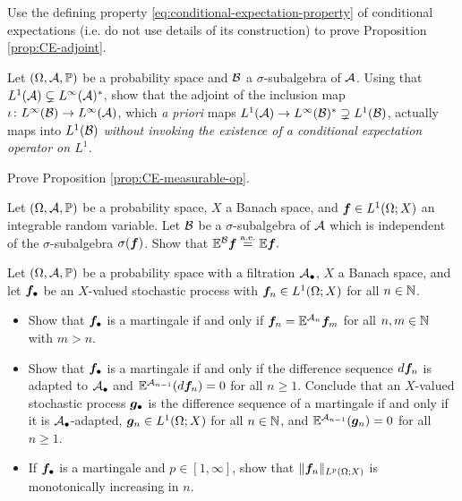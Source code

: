 \begin{exercise}\label{ex:CE-adjoint}
  Use the defining property \eqref{eq:conditional-expectation-property} of conditional expectations (i.e. do not use details of its construction) to prove Proposition \ref{prop:CE-adjoint}.
\end{exercise}

\begin{exercise}\label{ex:conditional-expectation-as-adjoint}
  Let $(\Omega,\mathcal{A},\mathbb{P})$ be a probability space and $\mathcal{B}$ a $\sigma$-subalgebra of $\mathcal{A}$.
  Using that $L^1(\mathcal{A}) \subsetneq L^\infty(\mathcal{A})^*$, show that the adjoint of the inclusion map $\iota \colon L^\infty(\mathcal{B}) \rightarrow L^\infty(\mathcal{A})$, which \emph{a priori} maps $L^1(\mathcal{A}) \to L^\infty(\mathcal{B})^* \supsetneq L^1(\mathcal{B})$, actually maps into $L^1(\mathcal{B})$ \emph{without invoking the existence of a conditional expectation operator on $L^1$.}
\end{exercise}

\begin{exercise}\label{ex:CE-measurable-op}
  Prove Proposition \ref{prop:CE-measurable-op}.
\end{exercise}

\begin{exercise}\label{ex:ce-ind}
  Let $(\Omega,\mathcal{A},\mathbb{P})$ be a probability space, $X$ a Banach space, and $\bm{f} \in L^1(\Omega;X)$ an integrable random variable.
  Let $\mathcal{B}$ be a $\sigma$-subalgebra of $\mathcal{A}$ which is independent of the $\sigma$-subalgebra $\sigma(\bm{f})$.
  Show that $\mathbb{E}^{\mathcal{B}} \bm{f} \stackrel{\mathrm{a.e.}}{=} \mathbb{E} \bm{f}.$
\end{exercise}

\begin{exercise}\label{ex:martingale-elementary-properties}
  Let $(\Omega,\mathcal{A},\mathbb{P})$ be a probability space with a filtration $\mathcal{A}_{\bullet}$, $X$ a Banach space, and let $\bm{f}_{\bullet}$ be an $X$-valued stochastic process with $\bm{f}_{n} \in L^1(\Omega;X)$ for all $n \in \mathbb{N}$.
  \begin{itemize}
  \item
    Show that $\bm{f}_{\bullet}$ is a martingale if and only if $\bm{f}_n = \mathbb{E}^{\mathcal{A}_n} \bm{f}_m$ for all $n,m \in \mathbb{N}$ with $m > n$.
  \item
    Show that $\bm{f}_{\bullet}$ is a martingale if and only if the difference sequence $d\bm{f}_{n}$ is adapted to $\mathcal{A}_{\bullet}$ and $\mathbb{E}^{\mathcal{A}_{n-1}} (d\bm{f}_{n}) = 0$ for all $n \geq 1$.
    Conclude that an $X$-valued stochastic process $\bm{g}_{\bullet}$ is the difference sequence of a martingale if and only if it is $\mathcal{A}_{\bullet}$-adapted, $\bm{g}_{n} \in L^1(\Omega;X)$ for all $n \in \mathbb{N}$, and $\mathbb{E}^{\mathcal{A}_{n-1}}(\bm{g}_{n}) = 0$ for all $n \geq 1$.
  \item
    If $\bm{f}_{\bullet}$ is a martingale and $p \in [1,\infty]$, show that $\|\bm{f}_{n}\|_{L^p(\Omega;X)}$ is monotonically increasing in $n$.
  \end{itemize}
\end{exercise}

